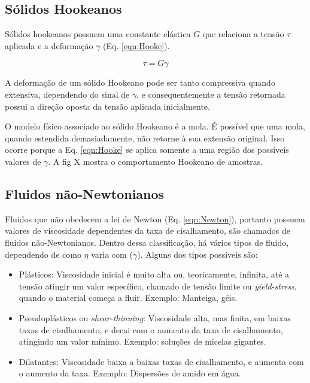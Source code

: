 			\subsection{Sólidos Hookeanos}
			
			Sólidos hookeanos possuem uma constante elástica \(G\) que relaciona a tensão \(\tau\) aplicada e a deformação \(\gamma\) (Eq. \ref{eqn:Hooke}).
			
			\begin{equation}
				\tau = G\gamma
				\label{eqn:Hooke}
			\end{equation}
			
			A deformação de um sólido Hookeano pode ser tanto compressiva quando extensiva, dependendo do sinal de \(\gamma\), e consequentemente a tensão retornada possui a direção oposta da tensão aplicada inicialmente. 
			
			O modelo físico associado ao sólido Hookeano é a mola. É possível que uma mola, quando estendida demasiadamente, não retorne à sua extensão original. Isso ocorre porque a Eq. \ref{eqn:Hooke} se aplica somente a uma região dos possíveis valores de \(\gamma\). A fig X mostra o comportamento Hookeano de amostras.
			
			
			\subsection{Fluidos não-Newtonianos}
			
			Fluidos que não obedecem a lei de Newton (Eq. \ref{eqn:Newton}), portanto possuem valores de viscosidade dependentes da taxa de cisalhamento, são chamados de fluidos não-Newtonianos. Dentro dessa classificação, há vários tipos de fluido, dependendo de como \(\eta\) varia com (\(\dot{\gamma}\)). Alguns dos tipos possíveis são:
			
			\begin{itemize}[noitemsep]
				\item Plásticos: Viscosidade inicial é muito alta ou, teoricamente, infinita, até a tensão atingir um valor específico, chamado de tensão limite ou \emph{yield-stress}, quando o material começa a fluir. Exemplo: Manteiga, géis. %
				\item Pseudoplásticos ou \emph{shear-thinning}: Viscosidade alta, mas finita, em baixas taxas de cisalhamento, e decai com o aumento da taxa de cisalhamento, atingindo um valor mínimo. Exemplo: soluções de micelas gigantes.
				\item Dilatantes: Viscosidade baixa a baixas taxas de cisalhamento, e aumenta com o aumento da taxa. Exemplo: Dispersões de amido em água.
			\end{itemize}
			
